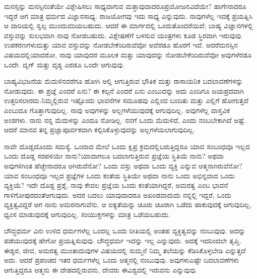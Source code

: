\vskip 3pt

ಮನಸ್ಸನ್ನು ಮನಸ್ಸಿನಂತೆಯೇ ವಿಶ್ಲೇಷಿಸಲು ಸಾಧ್ಯವಾಗುವ ಮತ್ತಾವುದಾದರೂ\break ಪ್ರಯೋಜನವಿದೆಯೇ? ಹಾಗೇನಾದರೂ ಇದ್ದರೆ ಆಗ ಮಾತ್ರ ಧರ್ಮದ ವಿಜ್ಞಾನ\break ಸಾಧ್ಯ. ರಾಜಯೋಗವು ಇದು ಸಾಧ್ಯ ಎನ್ನುವುದು. ನಾವುಗಳೆಲ್ಲ ಇದಕ್ಕೆ ಪ್ರಯತ್ನಿಸಿ ಆ ದಾರಿಯಲ್ಲಿ ಸ್ವಲ್ಪ ಮುಂದುವರಿಯಬಹುದು. ಆದರೆ ಈ ಮಾರ್ಗದಲ್ಲಿ ಒಂದು\break ತೊಂದರೆಯಿದೆ; ಬಾಹ್ಯ ವಿಜ್ಞಾನಗಳಲ್ಲಿ ವಸ್ತುವನ್ನು ಸುಲಭವಾಗಿ ನಾವು ನೋಡಬಹುದು. ವಿಶ್ಲೇಷಣೆಗೆ ಬಳಸುವ ಯಂತ್ರಗಳು ಕೂಡ ಸ್ಥಿರವಾಗಿ ಇರುವುವು. ಉಪಕರಣಗಳು\break ಮತ್ತು ಯಾವ ವಸ್ತುವನ್ನು ನೋಡಬೇಕೆಂದಿರುವೆವೋ ಅವೆರಡೂ ಹೊರಗೆ ಇವೆ. ಆದರೆ\break ಮನಸ್ಸಿನ ವಿಷಯದಲ್ಲಿಯಾದರೋ, ನಾವು ಯಾವುದರ ಮೂಲಕ ಮತ್ತು ಯಾವುದನ್ನು ನೋಡಬೇಕೆಂದಿರುವೆವೋ ಅವುಗಳೆರಡೂ ಒಂದೇ. ದೃಗ್​ ಮತ್ತು ದೃಶ್ಯ ಎರಡೂ ಒಂದೇ ಆಗುವುವು.

\vskip 3pt

ಬಾಹ್ಯವಿಭಜನೆಯ ಮೆದುಳಿನವರೆಗೂ ಹೋಗಿ ಅಲ್ಲಿ ಆಗುತ್ತಿರುವ ಭೌತಿಕ ಮತ್ತು ರಾಸಾಯನಿಕ ಬದಲಾವಣೆಗಳನ್ನು ನೋಡುವುದು. ಈ ಪ್ರಜ್ಞೆ ಎಂದರೆ ಏನು? ಈ ಕಲ್ಪನೆ ಎಂದರೆ ಏನು ಎಂಬುದನ್ನು ಅದು ಎಂದಿಗೂ ಜಯಪ್ರದವಾಗಿ ಉತ್ತರಿಸಲಾರದು.\break ನಿಮ್ಮಲ್ಲಿರುವ ಇಷ್ಟೊಂದು ಭಾವನೆಗಳ ಸಮೂಹವು ಎಲ್ಲಿಂದ ಬಂದಿತು ಮತ್ತು ಎಲ್ಲಿಗೆ ಹೋಗುತ್ತದೆ ಎಂಬುದೂ ಗೊತ್ತಾಗುವುದಿಲ್ಲ. ನಾವು ಅವುಗಳನ್ನು ಅಲ್ಲಗಳೆಯುವುದಕ್ಕೆ ಆಗುವುದಿಲ್ಲ. ಅವುಗಳೆಲ್ಲ ವಾಸ್ತವಿಕ ಅಂಶಗಳು. ನಾನು ನನ್ನ ಮೆದುಳನ್ನು ಎಂದೂ ನೋಡಿಲ್ಲ. ನನಗೆ ಒಂದು ಮೆದುಳಿದೆ, ಎಂದು ನಂಬಬೇಕಾಗಿದೆ ಅಷ್ಟೆ. ಆದರೆ ಮಾನವ ತನ್ನ ಪ್ರಜ್ಞಾಪೂರ್ವಕವಾಗಿ ಕಲ್ಪಿಸಿಕೊಳ್ಳುವುದನ್ನು ಅಲ್ಲಗಳೆಯಲಾಗುವುದಿಲ್ಲ.

\vskip 3pt

ನಾವೇ ದೊಡ್ಡದೊಂದು ಸಮಸ್ಯೆ. ಒಂದಾದ ಮೇಲೆ ಒಂದು ಕ್ಷಿಪ್ರ ಕ್ರಮದಲ್ಲಿ\break ಬರುತ್ತಿದ್ದರೂ ಯಾವ ಸಂಬಂಧವೂ ಇಲ್ಲದ ಒಂದು ದೊಡ್ಡ ಸರಪಳಿಯೇ ನಾನು?\break ಯಾವಾಗಲೂ ಬದಲಾಗುತ್ತಿರುವ ಪ್ರಜ್ಞೆಯ ಸ್ಥಿತಿಯೆ ನಾನು? ಅಥವಾ ಅವುಗಳಿಗಿಂತ ಹೆಚ್ಚೇನಾದರೂ ಆಗಿರುವೆನೋ? ಒಂದು ವಸ್ತು ಅಥವಾ ಒಂದು ವ್ಯಕ್ತಿ ಎನ್ನುವ ಆತ್ಮನಾಗಿರು\-ವೆನೋ? ಯಾವ ಸಂಬಂಧವೂ ಇಲ್ಲದ ಪ್ರಜ್ಞೆಗಳ ಒಂದು ಕಂತೆಯ ಸ್ಥಿತಿಯೇ ಅಥವಾ ನಾನು ಒಂದು ಅಭಿನ್ನವಾದ ಒಂದು ವ್ಯಕ್ತಿಯೆ? ಇದೇ ದೊಡ್ಡ ಪ್ರಶ್ನೆ, ನಾವು ಕೇವಲ ಪ್ರಜ್ಞೆಯ ಒಂದು ಕಂತೆಯಾಗಿದ್ದರೆ, ಅಮರತ್ವ ಎಂಬ ಭಾವನೆ ಗಾಳಿಗೋಪುರದಂತೆ\break ಆಗುವುದು. ಅದರ ಬದಲು ಯಾವುದಾದರೂ ಅಖಂಡವಾದುದು ನನ್ನಲ್ಲಿ ಇದ್ದರೆ, ಒಂದು ವ್ಯಕ್ತಿತ್ವವಿದ್ದರೆ ಆಗ ನಾನು ಅಮರನಾಗುವೆನು. ಆ ಐಕ್ಯತೆಯನ್ನು ಚೂರು ಚೂರಾಗಿ ಒಡೆದು ಹಾಕುವುದಕ್ಕೆ ಆಗುವುದಿಲ್ಲ, ಧ್ವಂಸ ಮಾಡುವುದಕ್ಕೆ ಆಗುವುದಿಲ್ಲ. ಸಂಯುಕ್ತಗಳನ್ನು ಮಾತ್ರ ಒಡೆಯಬಹುದು.

\vskip 3pt

ಬೌದ್ಧಧರ್ಮ ವಿನಃ ಉಳಿದ ಧರ್ಮಗಳೆಲ್ಲ ಒಂದಲ್ಲ ಒಂದು ರೀತಿಯಲ್ಲಿ ಅಂತಹ ವ್ಯಕ್ತಿತ್ವವನ್ನು ನಂಬುವುವು. ಅದನ್ನು ಪಡೆಯುವುದಕ್ಕೆ ಹೇಗೋ ಪ್ರಯತ್ನಿಸುವುವು. ಬೌದ್ಧಧರ್ಮ ಇದನ್ನು ಇಲ್ಲ ಎನ್ನುವುದು. ಅದಕ್ಕೆ ಇದರಿಂದಲೇ ತೃಪ್ತಿ. ಈಶ್ವರ, ಜೀವ, ಅಮರತ್ವ ಮುಂತಾದುವುಗಳ ವಿಷಯದಲ್ಲಿ ಸುಮ್ಮನೆ ನಿಮ್ಮ ತಲೆಯನ್ನು ಕೆಡಿಸಿಕೊಳ್ಳಬೇಡಿ ಎನ್ನುತ್ತದೆ ಅದು. ಆದರೆ ಪ್ರಪಂಚದ ಇತರ ಧರ್ಮಗಳೆಲ್ಲ ಒಂದು ಆತ್ಮನಲ್ಲಿ ನಂಬುವುವು. ಅವುಗಳು\break ಎಷ್ಟೇ ಬದಲಾವಣೆಗಳು ಆಗುತ್ತಿದ್ದರೂ ಆತ್ಮನು ಈ ದೇಹದಲ್ಲಿರುವನು, ದೇವರು ಈ\break ವಿಶ್ವದಲ್ಲಿ ಇರುವನು ಎನ್ನುವುವು.

\vskip 3pt


